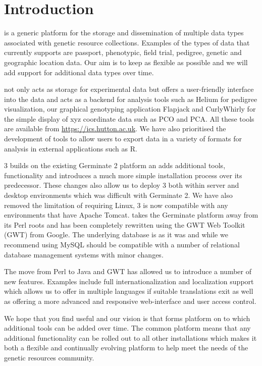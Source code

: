 \setcounter{page}{1}

\section{Introduction}
{\germinate} is a generic platform for the storage and dissemination of multiple data types associated with genetic resource collections. Examples of the types of data that {\germinate} currently supports are passport, phenotypic, field trial, pedigree, genetic and geographic location data. Our aim is to keep {\germinate} as flexible as possible and we will add support for additional data types over time.

{\germinate} not only acts as storage for experimental data but offers a user-friendly interface into the data and acts as a backend for analysis tools such as Helium for pedigree visualization, our graphical genotyping application Flapjack \cite{Flapjack} and CurlyWhirly for the simple display of xyz coordinate data such as PCO and PCA. All these tools are available from \url{https://ics.hutton.ac.uk}. We have also prioritised the development of tools to allow users to export data in a variety of formats for analysis in external applications such as R.

{\germinate} 3 builds on the existing Germinate 2 platform an adds additional tools, functionality and introduces a much more simple installation process over its predecessor. These changes also allow us to deploy {\germinate} 3 both within server and desktop environments which was difficult with Germinate 2. We have also removed the limitation of requiring Linux, {\germinate} 3 is now compatible with any environments that have Apache Tomcat. {\germinate} takes the Germinate platform away from its Perl roots and has been completely rewritten using the GWT Web Toolkit (GWT) from Google. The underlying database is as it was and while we recommend using MySQL should be compatible with a number of relational database management systems with minor changes. 

The move from Perl to Java and GWT has allowed us to introduce a number of new features. Examples include full internationalization and localization support which allows us to offer {\germinate} in multiple languages if suitable translations exit as well as offering a more advanced and
responsive web-interface and user access control.

We hope that you find {\germinate} useful and our vision is that {\germinate} forms platform on to which additional tools can be added over time. The common platform means that any additional functionality can be rolled out to all other {\germinate} installations which makes it both a flexible and continually evolving platform to help meet the needs of the genetic resources community.
 
